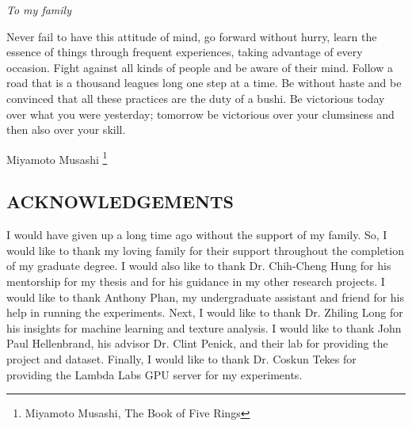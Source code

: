 \documentclass[12pt]{article}
\begin{document}
\vspace*{\fill}
\begin{center}
    \textit{To my family}
\end{center}
\vspace*{\fill}
\newpage

\vspace*{2in}
Never fail to have this attitude of mind, go forward without hurry, learn the
essence of things through frequent experiences, taking advantage of every
occasion. Fight against all kinds of people and be aware of their mind. Follow a
road that is a thousand leagues long one step at a time. Be without haste and be
convinced that all these practices are the duty of a bushi. Be victorious today
over what you were yesterday; tomorrow be victorious over your clumsiness and
then also over your skill.

\vspace{0.5in}
\hspace*{\fill} Miyamoto Musashi \footnote{Miyamoto Musashi, The Book of Five
    Rings}
\newpage

\begin{center}
    \section*{ACKNOWLEDGEMENTS}
\end{center}
\vspace{0.5in}

I would have given up a long time ago without the support of my family. So, I
would like to thank my loving family for their support throughout the completion
of my graduate degree. I would also like to thank Dr. Chih-Cheng Hung for his
mentorship for my thesis and for his guidance in my other research projects. I
would like to thank Anthony Phan, my undergraduate assistant and friend for his
help in running the experiments. Next, I would like to thank Dr. Zhiling Long
for his insights for machine learning and texture analysis. I would like to
thank John Paul Hellenbrand, his advisor Dr. Clint Penick, and their lab for
providing the project and dataset. Finally, I would like to thank Dr. Coskun
Tekes for providing the Lambda Labs GPU server for my experiments.
\newpage

\begin{center}
    \tableofcontents
\end{center}
\newpage
\end{document}
